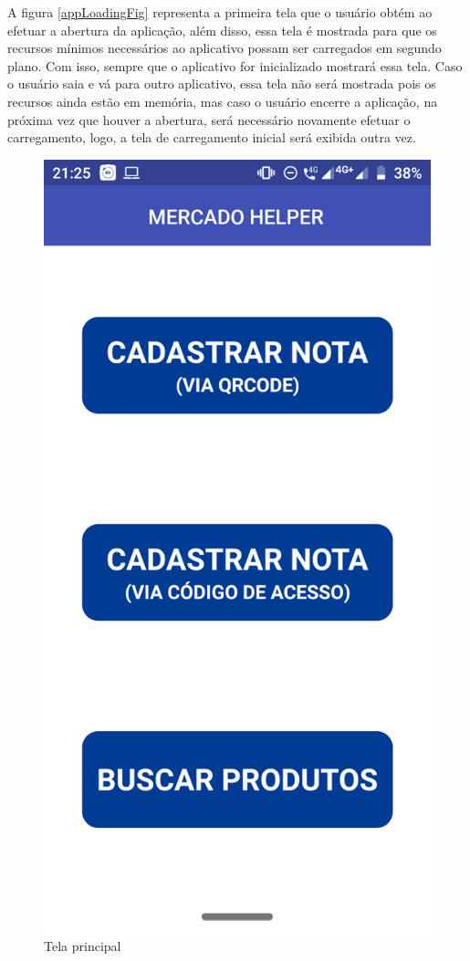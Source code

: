 A figura \ref{appLoadingFig} representa a primeira tela que o usuário obtém ao efetuar a abertura da aplicação, além disso, essa tela é mostrada para que os recursos mínimos necessários ao aplicativo possam ser carregados em segundo plano. Com isso, sempre que o aplicativo for inicializado mostrará essa tela. Caso o usuário saia e vá para outro aplicativo, essa tela não será mostrada pois os recursos ainda estão em memória, mas caso o usuário encerre a aplicação, na próxima vez que houver a abertura, será necessário novamente efetuar o carregamento, logo, a tela de carregamento inicial será exibida outra vez.

\begin{figure}[h]
    \centering
    \includegraphics[scale=0.15]{tcc/figures/app/app_home.png}
    \caption{Tela principal}
    \label{appHomeFig}
\end{figure}


